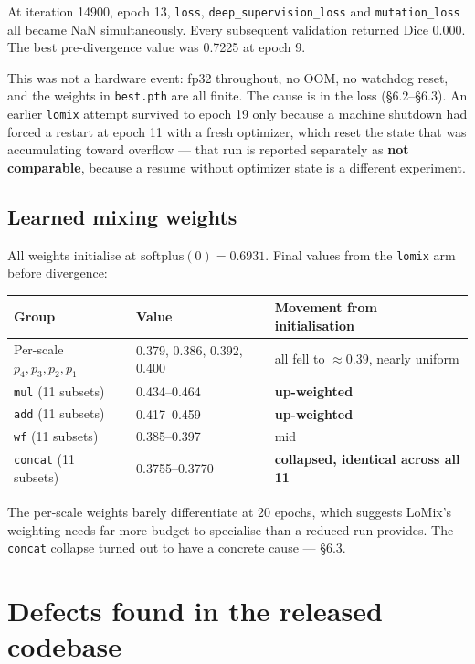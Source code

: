 \documentclass[11pt,a4paper]{article}
\newcommand{\code}[1]{\texttt{\small #1}}
\begin{document}
At iteration 14900, epoch 13, \code{loss}, \code{deep\_supervision\_loss} and
\code{mutation\_loss} all became NaN simultaneously. Every subsequent validation
returned Dice 0.000. The best pre-divergence value was 0.7225 at epoch 9.

This was not a hardware event: fp32 throughout, no OOM, no watchdog reset, and
the weights in \code{best.pth} are all finite. The cause is in the loss
(\S6.2--\S6.3). An earlier \code{lomix} attempt survived to epoch 19 only
because a machine shutdown had forced a restart at epoch 11 with a fresh
optimizer, which reset the state that was accumulating toward overflow --- that
run is reported separately as \textbf{not comparable}, because a resume without
optimizer state is a different experiment.

\subsection{Learned mixing weights}

All weights initialise at $\mathrm{softplus}(0) = 0.6931$. Final values from the
\code{lomix} arm before divergence:

\begin{center}
\begin{tabular}{@{}llp{7.0cm}@{}}
\toprule
\textbf{Group} & \textbf{Value} & \textbf{Movement from initialisation} \\
\midrule
Per-scale $p_4,p_3,p_2,p_1$ & 0.379, 0.386, 0.392, 0.400 & all fell to ${\approx}0.39$, nearly uniform \\
\code{mul} (11 subsets) & 0.434--0.464 & \textbf{up-weighted} \\
\code{add} (11 subsets) & 0.417--0.459 & \textbf{up-weighted} \\
\code{wf} (11 subsets) & 0.385--0.397 & mid \\
\code{concat} (11 subsets) & 0.3755--0.3770 & \textbf{collapsed, identical across all 11} \\
\bottomrule
\end{tabular}
\end{center}

The per-scale weights barely differentiate at 20 epochs, which suggests LoMix's
weighting needs far more budget to specialise than a reduced run provides. The
\code{concat} collapse turned out to have a concrete cause --- \S6.3.

\section{Defects found in the released codebase}
\end{document}
